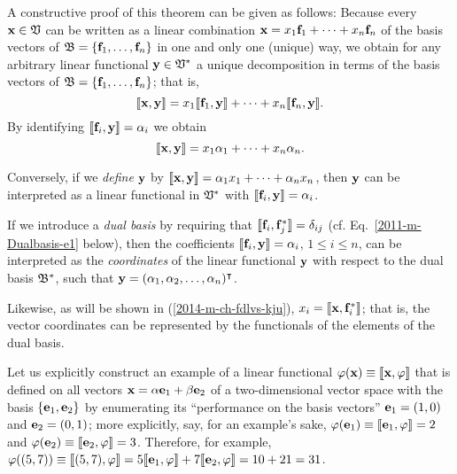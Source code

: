 {\color{OliveGreen}
\bproof
A constructive proof  of this theorem can be given as follows:
Because every ${\bf x}\in {\frak V}$
can be written as a linear combination $ {\bf x} = x_1 {\bf f}_1 +\cdots + x_n {\bf f}_n$
of the basis vectors of ${\frak B} = \{{\bf f}_1,\ldots , {\bf f}_n\}$
in one and only one (unique) way, we obtain for any arbitrary linear functional ${\bf y} \in {\frak V}^\ast $  a unique decomposition
in terms of the basis vectors of  ${\frak B} = \{{\bf f}_1,\ldots , {\bf f}_n\}$; that is,
\begin{equation}
\llbracket {\bf x},{\bf y}\rrbracket
=
x_1 \llbracket {\bf f}_1 ,{\bf y}\rrbracket  +\cdots + x_n \llbracket {\bf f}_n ,{\bf y}\rrbracket  .
\end{equation}
By identifying  $\llbracket {\bf f}_i ,{\bf y}\rrbracket =\alpha_i$ we obtain
\begin{equation}
\llbracket {\bf x},{\bf y}\rrbracket
=
x_1 \alpha_1 +\cdots + x_n \alpha_n .
\end{equation}
\eproof
}

Conversely, if we {\em define} ${\bf y}$ by $\llbracket {\bf x},{\bf y}\rrbracket  =\alpha_1  x_1+ \cdots +\alpha_n x_n$, then ${\bf y}$
can be interpreted as a linear functional in ${\frak V}^\ast$ with $\llbracket {\bf f}_i,{\bf y}\rrbracket  = \alpha_i$.

If we introduce a {\em dual basis}
by requiring that $\llbracket {\bf f}_i,  {\bf f}_j^\ast \rrbracket =\delta_{ij}$ (cf. Eq.~\ref{2011-m-Dualbasis-e1} below),
then the coefficients $\llbracket {\bf f}_i ,{\bf y}\rrbracket  = \alpha_i$,
$1\le i \le n$, can be interpreted
as the {\em coordinates} of the linear functional ${\bf y}$ with respect to the dual
basis ${\frak B}^\ast$, such that ${\bf y}=(\alpha_1,\alpha_2,\ldots , \alpha_n)^\intercal $.

Likewise, as will be shown in (\ref{2014-m-ch-fdlvs-kju}),
$
x_i =
 \llbracket {\bf x},{\bf f}_i^\ast \rrbracket
$; that is, the vector coordinates can be represented by the functionals of the elements of the dual basis.


{\color{blue}
\bexample
Let us explicitly construct an example of a linear functional $\varphi ({\bf x})\equiv \llbracket {\bf x},\varphi\rrbracket $ that is defined
on all vectors ${\bf x}=
\alpha {\bf e}_1
+
\beta {\bf e}_2
$
of a two-dimensional vector space with the basis $\{{\bf e}_1, {\bf e}_2 \}$
by enumerating its ``performance on the basis vectors''  ${\bf e}_1=(1,0)$ and ${\bf e}_2=(0,1)$;
more explicitly,  say, for an example's sake,
$\varphi ({\bf e}_1 ) \equiv \llbracket  {\bf e}_1,\varphi \rrbracket  = 2$ and
$\varphi ({\bf e}_2 ) \equiv \llbracket  {\bf e}_2,\varphi \rrbracket  = 3$.
Therefore, for example,
$\varphi ((5,7) ) \equiv \llbracket (5,7), \varphi \rrbracket  = 5 \llbracket {\bf e}_1, \varphi \rrbracket  + 7 \llbracket  {\bf e}_2,\varphi \rrbracket
=10+21=31$.
\eexample
}

